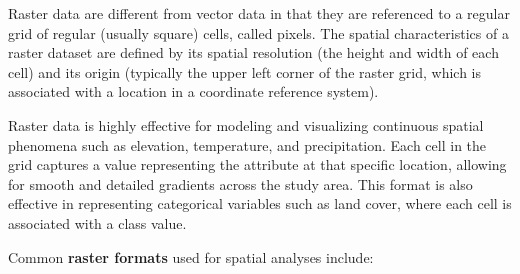 \documentclass[
]{article}
\begin{document}
Raster data are different from vector data in that they are referenced to a regular grid of regular (usually square) cells, called pixels. The spatial characteristics of a raster dataset are defined by its spatial resolution (the height and width of each cell) and its origin (typically the upper left corner of the raster grid, which is associated with a location in a coordinate reference system).

Raster data is highly effective for modeling and visualizing continuous spatial phenomena such as elevation, temperature, and precipitation. Each cell in the grid captures a value representing the attribute at that specific location, allowing for smooth and detailed gradients across the study area. This format is also effective in representing categorical variables such as land cover, where each cell is associated with a class value.

Common \textbf{raster formats} used for spatial analyses include:
\end{document}
